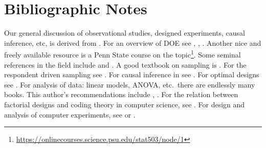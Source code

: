 \section{Bibliographic Notes}
Our general discussion of observational studies, designed experiments, causal inference, etc, is derived from \cite{cox_principles_2011}.
For an overview of DOE see \cite{cox_theory_2000}, \cite{mason_statistical_2003}, \cite{everitt_cambridge_2010}. 
Another nice and freely available resource is a Penn State course on the topic\footnote{\url{https://onlinecourses.science.psu.edu/stat503/node/1}}. 
Some seminal references in the field include \cite{fisher_design_1960} and \cite{box_statistics_1978}.
A good textbook on sampling is \cite{thompson_sampling_2012}. 
For the respondent driven sampling see \cite{berchenko_modeling_2013}.
For causal inference in see \cite{rosenbaum_observational_2002}. 
For optimal designs see \cite{pukelsheim_optimal_1993}.
For analysis of data: linear models, ANOVA, etc.\ there are endlessly many books. This author's recommendations include \cite{hocking_analysis_1985}, \cite{greene_econometric_2003}. 
For the relation between factorial designs and coding theory in computer science, see \cite{hill_first_1986}. 
For design and analysis of computer experiments, see \cite{sacks_design_1989} or \cite{santner_design_2013}.
